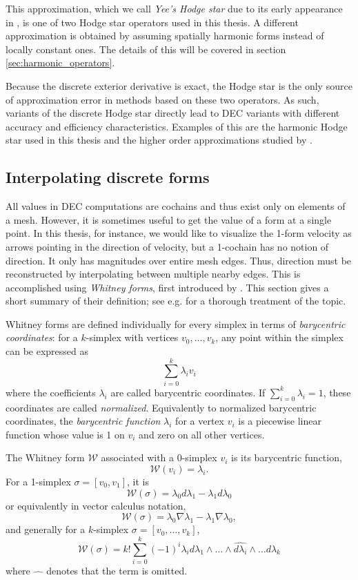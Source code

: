 \documentclass[utf8,english]{gradu3}
\begin{document}
This approximation, which we call \textit{Yee's Hodge star}
due to its early appearance in \textcite{yee_numerical_1966},
is one of two Hodge star operators used in this thesis.
A different approximation is obtained by assuming spatially harmonic forms
instead of locally constant ones.
The details of this will be covered in section \ref{sec:harmonic_operators}.

Because the discrete exterior derivative is exact,
the Hodge star is the only source of approximation error
in methods based on these two operators.
As such, variants of the discrete Hodge star directly lead to
DEC variants with different accuracy and efficiency characteristics.
Examples of this are the harmonic Hodge star used in this thesis
and the higher order approximations studied by \textcite{lohi_higher_2023}.


\subsection{Interpolating discrete forms}\label{sec:interpolation}

All values in DEC computations are cochains
and thus exist only on elements of a mesh.
However, it is sometimes useful to get the value of a form at a single point.
In this thesis, for instance, we would like to visualize
the 1-form velocity as arrows pointing in the direction of velocity,
but a 1-cochain has no notion of direction.
It only has magnitudes over entire mesh edges.
Thus, direction must be reconstructed by interpolating between multiple nearby edges.
This is accomplished using \textit{Whitney forms},
first introduced by \textcite{whitney_geometric_1957}.
This section gives a short summary of their definition;
see e.g. \textcite{lohi_whitney_2021} for a thorough treatment of the topic.

Whitney forms are defined individually for every simplex
in terms of \textit{barycentric coordinates}:
for a $k$-simplex with vertices $v_0, \dots, v_k$,
any point within the simplex can be expressed as
\[
  \sum_{i=0}^k \lambda_i v_i
\]
where the coefficients $\lambda_i$ are called barycentric coordinates.
If $\sum_{i=0}^k \lambda_i = 1$, these coordinates are called \textit{normalized}.
Equivalently to normalized barycentric coordinates,
the \textit{barycentric function} $\lambda_i$ for a vertex $v_i$
is a piecewise linear function whose value is 1 on $v_i$
and zero on all other vertices.

The Whitney form $\mathcal{W}$ associated with a 0-simplex $v_i$
is its barycentric function,
\[
  \mathcal{W}(v_i) = \lambda_i.
\]
For a 1-simplex $\sigma = [v_0,v_1]$, it is
\[
  \mathcal{W}(\sigma) = \lambda_0 d\lambda_1 - \lambda_1 d\lambda_0
\]
or equivalently in vector calculus notation,
\[
  \mathcal{W}(\sigma) = \lambda_0 \nabla\lambda_1 - \lambda_1 \nabla\lambda_0,
\]
and generally for a $k$-simplex $\sigma = [v_0,\dots,v_k]$,
\begin{equation}
  \mathcal{W}(\sigma) = k! \sum_{i=0}^{k} (-1)^i
    \lambda_i d\lambda_1 \wedge \dots \wedge \widehat{d\lambda_i}
    \wedge \dots d\lambda_k
\end{equation}
where $\widehat{\quad}$ denotes that the term is omitted.
\end{document}
